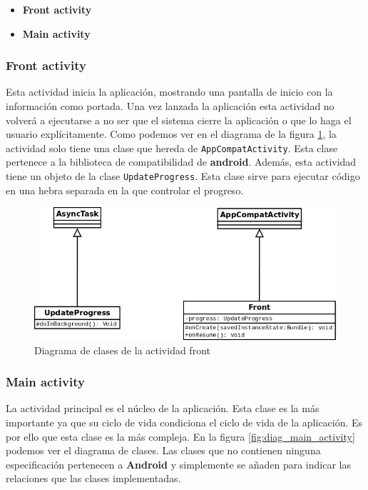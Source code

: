 \begin{itemize}
  \item \textbf{Front activity}
  \item \textbf{Main activity}
\end{itemize}

\subsubsection{Front activity}

Esta actividad inicia la aplicación, mostrando una pantalla de inicio con la información como portada. Una vez lanzada la aplicación esta actividad no volverá a ejecutarse a no ser que el sistema cierre la aplicación o que lo haga el usuario explícitamente. Como podemos ver en el diagrama de la figura \ref{fig:diag_front}, la actividad solo tiene una clase que hereda de \texttt{AppCompatActivity}. Esta clase pertenece a la biblioteca de compatibilidad de \textbf{android}. Además, esta actividad tiene un objeto de la clase \texttt{UpdateProgress}. Esta clase sirve para ejecutar código en una hebra separada en la que controlar el progreso.

\bigskip
\begin{figure}[!ht]
  \begin{center}
  \includegraphics[width=1\textwidth]{../images/front_diag.png}
  \caption{Diagrama de clases de la actividad front}
  \label{fig:diag_front}
  \end{center}
\end{figure}


\subsubsection{Main activity}

La actividad principal es el núcleo de la aplicación. Esta clase es la más importante ya que su ciclo de vida condiciona el ciclo de vida de la aplicación. Es por ello que esta clase es la más compleja. En la figura \ref{fig:diag_main_activity} podemos ver el diagrama de clases. Las clases que no contienen ninguna especificación pertenecen a \textbf{Android} y simplemente se añaden para indicar las relaciones que las clases implementadas.


